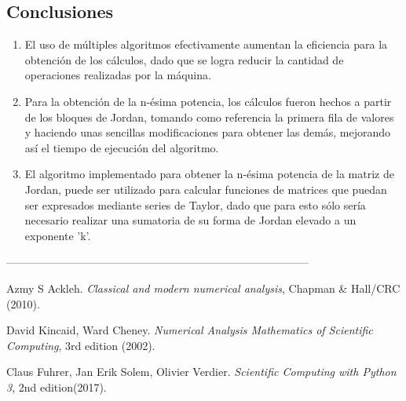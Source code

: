 \documentclass[12pt,a4paper]{article}
\begin{document}
\begin{multicols}{2}
	\section{Conclusiones}
	\begin{enumerate}
		\item El uso de múltiples algoritmos efectivamente aumentan la eficiencia para la obtención de los cálculos, dado que se logra reducir la cantidad de operaciones realizadas por la máquina.
		\item Para la obtención de la n-ésima potencia, los cálculos fueron hechos a partir de los bloques de Jordan, tomando como referencia la primera fila de valores y haciendo unas sencillas modificaciones para obtener las demás, mejorando así el tiempo de ejecución del algoritmo.
		\item El algoritmo implementado para obtener la n-ésima potencia de la matriz de Jordan, puede ser utilizado para calcular funciones de matrices que puedan ser expresados mediante series de Taylor, dado que para esto sólo sería necesario realizar una sumatoria de su forma de Jordan elevado a un exponente 'k'. 
	\end{enumerate}
\end{multicols}

\begin{center}
	-----------------------------------------------------------------------------------
\end{center}
\begin{multicols}{2}
	\begin{list}{}{\setlength{\topsep}{0mm}\setlength{\itemsep}{0mm}%
			\setlength{\parsep}{0mm}\setlength{\leftmargin}{4mm}}
		\small
		\item[1.] Azmy S Ackleh. \textit{Classical and modern numerical analysis}, Chapman \& Hall/CRC (2010).
		\item[2.] David Kincaid, Ward Cheney. \textit{Numerical Analysis Mathematics of Scientific Computing}, 3rd edition (2002).
		\item[3.] Claus Fuhrer, Jan Erik Solem, Olivier Verdier. \textit{Scientific Computing with Python 3}, 2nd edition(2017).
	\end{list}
\end{multicols}
\end{document}
